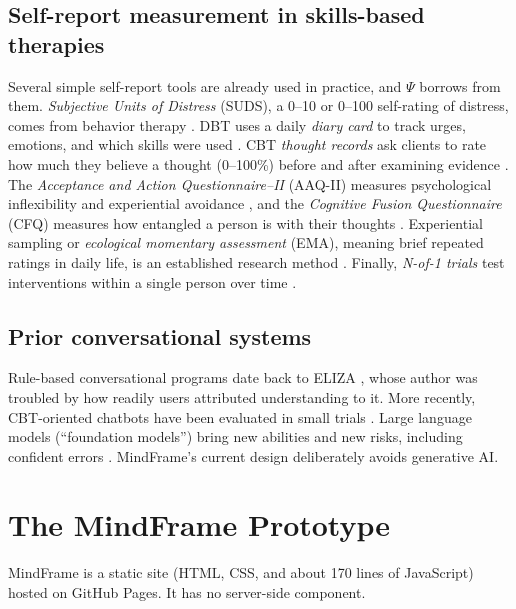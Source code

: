 \documentclass[11pt]{article}
\begin{document}
\subsection{Self-report measurement in skills-based therapies}
Several simple self-report tools are already used in practice, and $\Psi$ borrows from them. \emph{Subjective Units of Distress} (SUDS), a 0--10 or 0--100 self-rating of distress, comes from behavior therapy \citep{wolpe1969}. DBT uses a daily \emph{diary card} to track urges, emotions, and which skills were used \citep{linehan2015}. CBT \emph{thought records} ask clients to rate how much they believe a thought (0--100\%) before and after examining evidence \citep{beck2011}. The \emph{Acceptance and Action Questionnaire--II} (AAQ-II) measures psychological inflexibility and experiential avoidance \citep{bond2011}, and the \emph{Cognitive Fusion Questionnaire} (CFQ) measures how entangled a person is with their thoughts \citep{gillanders2014}. Experiential sampling or \emph{ecological momentary assessment} (EMA), meaning brief repeated ratings in daily life, is an established research method \citep{shiffman2008}. Finally, \emph{N-of-1 trials} test interventions within a single person over time \citep{kravitz2014}.

\subsection{Prior conversational systems}
Rule-based conversational programs date back to ELIZA \citep{weizenbaum1966}, whose author was troubled by how readily users attributed understanding to it. More recently, CBT-oriented chatbots have been evaluated in small trials \citep[e.g.,][]{fitzpatrick2017}. Large language models (``foundation models'') bring new abilities and new risks, including confident errors \citep{bommasani2021}. MindFrame's current design deliberately avoids generative AI.

\section{The MindFrame Prototype}\label{sec:proto}
MindFrame is a static site (HTML, CSS, and about 170 lines of JavaScript) hosted on GitHub Pages. It has no server-side component.
\end{document}
